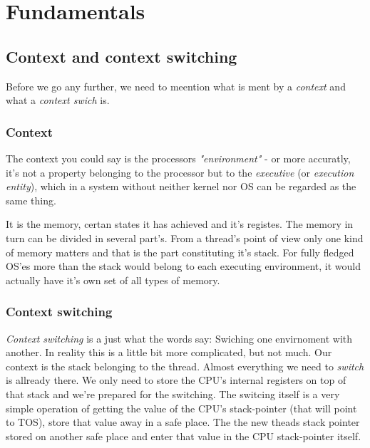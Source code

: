 \chapter{Fundamentals}

	\section{Context and context switching}
		Before we go any further, we need to meention what is ment by a \textit{context} and what a \textit{context swich} is.
	
		\subsection{Context}
			The context you could say is the processors \textit{"environment"} - or more accuratly, it's not a property belonging to the processor but to the \textit{executive} (or \textit{execution entity}), which in a system without neither kernel nor OS can be regarded as the same thing. 

			It is the memory, certan states it has achieved and it's registes. The memory in turn can be divided in several part's. From a thread's point of view only one kind of memory matters and that is the part constituting it's stack. For fully fledged OS'es more than the stack would belong to each executing environment, it would actually have it's own set of all types of memory.
	
		\subsection{Context switching}
			\textit{Context switching} is a just what the words say: Swiching one envirnoment with another. In reality this is a little bit more complicated, but not much. Our context is the stack belonging to the thread. Almost everything we need to \textit{switch} is allready there. We only need to store the CPU's internal registers on top of that stack and we're prepared for the switching. The switcing itself is a very simple operation of getting the value of the CPU's stack-pointer (that will point to TOS), store that value away in a safe place. The the new theads stack pointer stored on another safe place and enter that value in the CPU stack-pointer itself.

